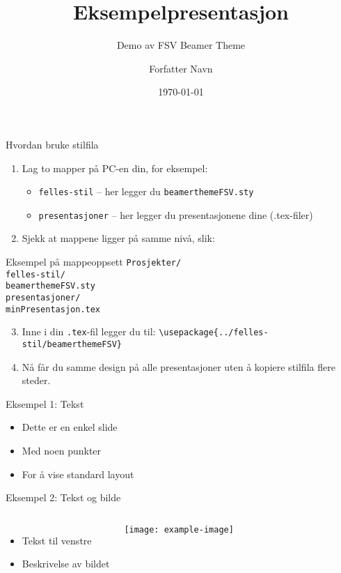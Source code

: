\documentclass{beamer}
\title{Eksempelpresentasjon}
\subtitle{Demo av FSV Beamer Theme}
\author{Forfatter Navn}
\institute{Fagskolen Viken}
\date{\today}
\begin{document}
	
	\begin{frame}
		\titlepage
	\end{frame}
	\begin{frame}{Hvordan bruke stilfila}
		\begin{enumerate}
			\item Lag to mapper på PC-en din, for eksempel:
			\begin{itemize}
				\item \texttt{felles-stil} – her legger du \texttt{beamerthemeFSV.sty}
				\item \texttt{presentasjoner} – her legger du presentasjonene dine (.tex-filer)
			\end{itemize}
			\item Sjekk at mappene ligger på samme nivå, slik:
		\end{enumerate}
		
		\begin{block}{Eksempel på mappeoppsett}
			\texttt{Prosjekter/} \\
			\quad \texttt{felles-stil/} \\
			\quad\quad \texttt{beamerthemeFSV.sty} \\
			\quad \texttt{presentasjoner/} \\
			\quad\quad \texttt{minPresentasjon.tex}
		\end{block}
		
		\begin{enumerate}
			\setcounter{enumi}{2}
			\item Inne i din \texttt{.tex}-fil legger du til:  
			\texttt{\textbackslash usepackage\{../felles-stil/beamerthemeFSV\}}
			\item Nå får du samme design på alle presentasjoner uten å kopiere stilfila flere steder.
		\end{enumerate}
	\end{frame}
	
	\begin{frame}{Eksempel 1: Tekst}
		\begin{itemize}
			\item Dette er en enkel slide
			\item Med noen punkter
			\item For å vise standard layout
		\end{itemize}
	\end{frame}
	\begin{frame}{Eksempel 2: Tekst og bilde}
		\begin{columns}
			\column{0.5\textwidth}
			\begin{itemize}
				\item Tekst til venstre
				\item Beskrivelse av bildet
			\end{itemize}
			\column{0.5\textwidth}
			\texttt{[image: example-image]}
		\end{columns}
	\end{frame}
	
\end{document}
